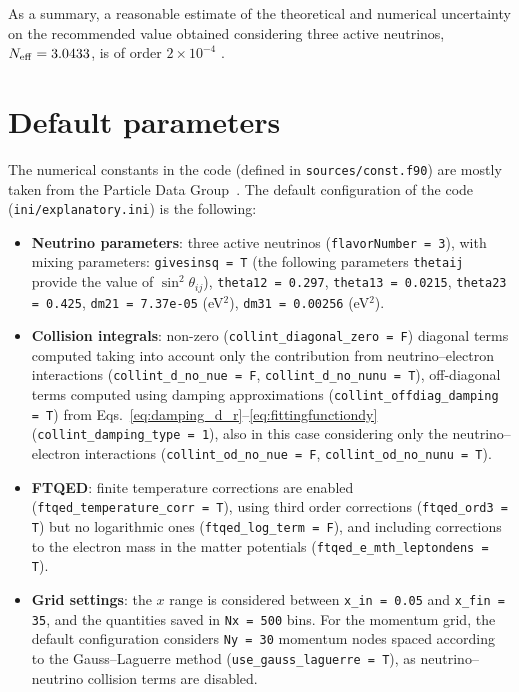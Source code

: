 \documentclass[notitlepage,nofootinbib,showpacs,preprintnumbers,amsmath,amssymb,superscriptaddress,prd,onecolumn]{revtex4-1}
\newcommand{\Neff}{\ensuremath{N_{\rm eff}}}
\begin{document}
As a summary, a reasonable estimate of the theoretical and numerical uncertainty on the recommended value
obtained considering three active neutrinos,
$\Neff=3.0433$,
is of order $2\times10^{-4}$ \cite{Bennett:2020zkv}.


\section{Default parameters}
\label{ssec:default}
The numerical constants in the code (defined in \texttt{sources/const.f90})
are mostly taken from the Particle Data Group~\cite{Tanabashi:2018oca,Zyla:2020zbs}.
The default configuration of the code (\texttt{ini/explanatory.ini}) is the following:
\begin{itemize}
\item
\textbf{Neutrino parameters}: three active neutrinos (\texttt{flavorNumber = 3}), with mixing parameters:
\texttt{givesinsq = T} (the following parameters \texttt{thetaij} provide the value of $\sin^2\theta_{ij}$),
\texttt{theta12 = 0.297},
\texttt{theta13 = 0.0215},
\texttt{theta23 = 0.425},
\texttt{dm21 = 7.37e-05} (eV$^2$),
\texttt{dm31 = 0.00256} (eV$^2$).
%
\item
\textbf{Collision integrals}: non-zero (\texttt{collint\_diagonal\_zero = F}) diagonal terms
computed taking into account only the contribution from neutrino--electron interactions
(\texttt{collint\_d\_no\_nue = F}, \texttt{collint\_d\_no\_nunu = T}),
off-diagonal terms computed using damping approximations
(\texttt{collint\_offdiag\_damping = T})
from Eqs.~\eqref{eq:damping_d_r}--\eqref{eq:fittingfunctiondy} (\texttt{collint\_damping\_type = 1}),
also in this case considering only the neutrino--electron interactions
(\texttt{collint\_od\_no\_nue = F}, \texttt{collint\_od\_no\_nunu = T}).
%
\item
\textbf{FTQED}:
finite temperature corrections are enabled
(\texttt{ftqed\_temperature\_corr = T}),
using third order corrections (\texttt{ftqed\_ord3 = T})
but no logarithmic ones (\texttt{ftqed\_log\_term = F}),
and including corrections to the electron mass in the matter potentials
(\texttt{ftqed\_e\_mth\_leptondens = T}).
%
\item
\textbf{Grid settings}:
the $x$ range is considered between
\texttt{x\_in = 0.05} and
\texttt{x\_fin = 35},
and the quantities saved in \texttt{Nx = 500} bins.
For the momentum grid, the default configuration considers \texttt{Ny = 30} momentum nodes
spaced according to the Gauss--Laguerre method (\texttt{use\_gauss\_laguerre = T}),
as neutrino--neutrino collision terms are disabled.

\end{itemize}
\end{document}
